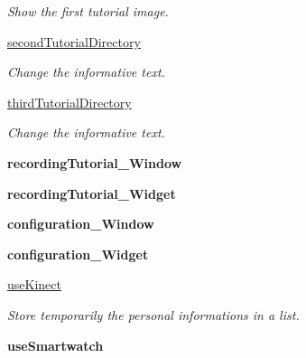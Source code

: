 \begin{DoxyCompactItemize}
\begin{DoxyCompactList}\small\item\em Show the first tutorial image. \end{DoxyCompactList}\item 
\hyperlink{classGUI__node_1_1MainWindow_a4e01d22041049f7266e34d9a59f8cb37}{second\+Tutorial\+Directory}
\begin{DoxyCompactList}\small\item\em Change the informative text. \end{DoxyCompactList}\item 
\hyperlink{classGUI__node_1_1MainWindow_a20e2d3b578d229d24d744e2d50269298}{third\+Tutorial\+Directory}
\begin{DoxyCompactList}\small\item\em Change the informative text. \end{DoxyCompactList}\item 
{\bfseries recording\+Tutorial\+\_\+\+Window}\hypertarget{classGUI__node_1_1MainWindow_aad2e758ee5e063c2ad4ef19f844c57dc}{}\label{classGUI__node_1_1MainWindow_aad2e758ee5e063c2ad4ef19f844c57dc}

\item 
{\bfseries recording\+Tutorial\+\_\+\+Widget}\hypertarget{classGUI__node_1_1MainWindow_a5c16c61707312e5a130e3ea3820e265b}{}\label{classGUI__node_1_1MainWindow_a5c16c61707312e5a130e3ea3820e265b}

\item 
{\bfseries configuration\+\_\+\+Window}\hypertarget{classGUI__node_1_1MainWindow_a4de2781d66d80d6b2952b23f4d560466}{}\label{classGUI__node_1_1MainWindow_a4de2781d66d80d6b2952b23f4d560466}

\item 
{\bfseries configuration\+\_\+\+Widget}\hypertarget{classGUI__node_1_1MainWindow_ab29ad358b5d15e794fca450f2ea6be0d}{}\label{classGUI__node_1_1MainWindow_ab29ad358b5d15e794fca450f2ea6be0d}

\item 
\hyperlink{classGUI__node_1_1MainWindow_a502815d4d7eab08224b9fe98c31483aa}{use\+Kinect}
\begin{DoxyCompactList}\small\item\em Store temporarily the personal informations in a list. \end{DoxyCompactList}\item 
{\bfseries use\+Smartwatch}\hypertarget{classGUI__node_1_1MainWindow_abc5e4adf04a73f194933033596408f8a}{}\label{classGUI__node_1_1MainWindow_abc5e4adf04a73f194933033596408f8a}


\end{DoxyCompactItemize}
